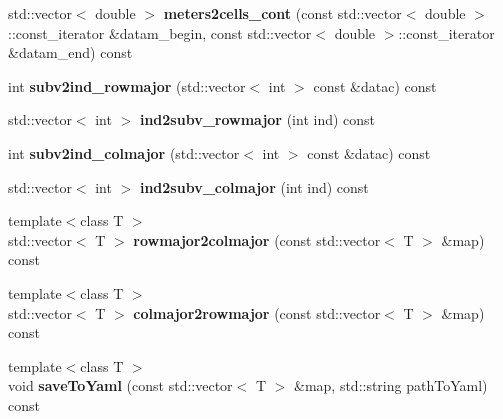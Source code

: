 \begin{DoxyCompactItemize}
\item 
\mbox{\label{classnx_1_1map__nd_a4d3ecbe0fcd2927e38e4cf016a614547}} 
std\+::vector$<$ double $>$ {\bfseries meters2cells\+\_\+cont} (const std\+::vector$<$ double $>$\+::const\+\_\+iterator \&datam\+\_\+begin, const std\+::vector$<$ double $>$\+::const\+\_\+iterator \&datam\+\_\+end) const
\item 
\mbox{\label{classnx_1_1map__nd_aa37889a8c513a7d56394e62f31419dea}} 
int {\bfseries subv2ind\+\_\+rowmajor} (std\+::vector$<$ int $>$ const \&datac) const
\item 
\mbox{\label{classnx_1_1map__nd_afe4a818dd9e09c399977518ca6ed601c}} 
std\+::vector$<$ int $>$ {\bfseries ind2subv\+\_\+rowmajor} (int ind) const
\item 
\mbox{\label{classnx_1_1map__nd_a7fb171f334cc7bae6c5460a95dfe77f2}} 
int {\bfseries subv2ind\+\_\+colmajor} (std\+::vector$<$ int $>$ const \&datac) const
\item 
\mbox{\label{classnx_1_1map__nd_a1c26f34a257da1a383c44fc395da026f}} 
std\+::vector$<$ int $>$ {\bfseries ind2subv\+\_\+colmajor} (int ind) const
\item 
\mbox{\label{classnx_1_1map__nd_ad92e02c6e22712e221669ecef801ddc6}} 
{\footnotesize template$<$class T $>$ }\\std\+::vector$<$ T $>$ {\bfseries rowmajor2colmajor} (const std\+::vector$<$ T $>$ \&map) const
\item 
\mbox{\label{classnx_1_1map__nd_ad59bef0b0ad7233cf712ab9feab536f1}} 
{\footnotesize template$<$class T $>$ }\\std\+::vector$<$ T $>$ {\bfseries colmajor2rowmajor} (const std\+::vector$<$ T $>$ \&map) const
\item 
\mbox{\label{classnx_1_1map__nd_aba9e7dece19f88bd8a9f8278b6549b00}} 
{\footnotesize template$<$class T $>$ }\\void {\bfseries save\+To\+Yaml} (const std\+::vector$<$ T $>$ \&map, std\+::string path\+To\+Yaml) const
\item 
\mbox{\label{classnx_1_1map__nd_ad6a5a17f9d570719bd0a3b181337e1c1}} 

\end{DoxyCompactItemize}
